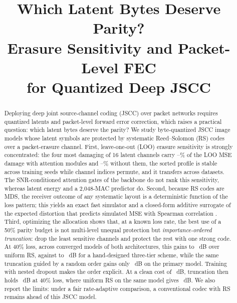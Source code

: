 \documentclass[conference]{IEEEtran}
\begin{document}
\title{Which Latent Bytes Deserve Parity?\\Erasure Sensitivity and Packet-Level FEC\\for Quantized Deep JSCC}
\author{}
\maketitle

\begin{abstract}
Deploying deep joint source-channel coding (JSCC) over packet networks requires quantized latents and
packet-level forward error correction, which raises a practical question: which latent bytes deserve the
parity? We study byte-quantized JSCC image models whose latent symbols are protected by systematic
Reed--Solomon (RS) codes over a packet-erasure channel. First, leave-one-out (LOO) erasure sensitivity is
strongly concentrated: the four most damaging of 16 latent channels carry
\TopFourShareMinAdj--\TopFourShareMaxAdj\% of the LOO MSE damage with attention modules and
\TopFourShareMinDeep--\TopFourShareMaxDeep\% without them, the sorted profile is stable across training
seeds while channel indices permute, and it transfers across datasets. The SNR-conditioned attention
gates of the backbone do not rank this sensitivity, whereas latent energy and a 2,048-MAC predictor do.
Second, because RS codes are MDS, the receiver outcome of any systematic layout is a deterministic
function of the loss pattern; this yields an exact fast simulator and a closed-form additive surrogate of
the expected distortion that predicts simulated MSE with Spearman correlation \SurrogateSpearman. Third,
optimizing the allocation shows that, at a known loss rate, the best use of a 50\% parity budget is not
multi-level unequal protection but \emph{importance-ordered truncation}: drop the least sensitive
channels and protect the rest with one strong code. At 40\% loss, across \ModelsAll{} converged models of
both architectures, this gains \TruncGainMinAll{} to \TruncGainMaxAll~dB over uniform RS, against
\HandGainMinAll{} to \HandGainMaxAll~dB for a hand-designed three-tier scheme, while the same truncation
guided by a random order gains only \TruncRandomGainForty~dB on the primary model. Training with nested
dropout makes the order explicit. At a clean cost of \OrderedCleanCost~dB, truncation then holds
\OrderedTruncForty~dB at 40\% loss, where uniform RS on the same model gives \OrderedUniformForty~dB. We also report the limits:
under a fair rate-adaptive comparison, a conventional codec with RS remains ahead of this JSCC model.
\end{abstract}
\end{document}
